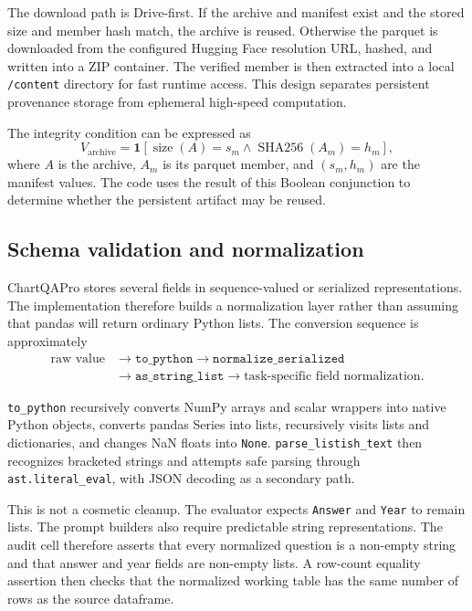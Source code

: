 \documentclass[11pt,a4paper]{article}
\newcommand{\code}[1]{\texttt{#1}}
\begin{document}
The download path is Drive-first. If the archive and manifest exist and the stored size and member hash match, the archive is reused. Otherwise the parquet is downloaded from the configured Hugging Face resolution URL, hashed, and written into a ZIP container. The verified member is then extracted into a local \code{/content} directory for fast runtime access. This design separates persistent provenance storage from ephemeral high-speed computation.

The integrity condition can be expressed as
\begin{equation}
V_{\mathrm{archive}}
=
\mathbf{1}\!
\left[
\operatorname{size}(A)=s_m
\land
\operatorname{SHA256}(A_m)=h_m
\right],
\end{equation}
where \(A\) is the archive, \(A_m\) is its parquet member, and \((s_m,h_m)\) are the manifest values. The code uses the result of this Boolean conjunction to determine whether the persistent artifact may be reused.

\subsection{Schema validation and normalization}
ChartQAPro stores several fields in sequence-valued or serialized representations. The implementation therefore builds a normalization layer rather than assuming that pandas will return ordinary Python lists. The conversion sequence is approximately
\[
\begin{aligned}
\text{raw value} &\rightarrow \texttt{to\_python}
\rightarrow \texttt{normalize\_serialized} \\
&\rightarrow \texttt{as\_string\_list}
\rightarrow \text{task-specific field normalization}.
\end{aligned}
\]

\code{to\_python} recursively converts NumPy arrays and scalar wrappers into native Python objects, converts pandas Series into lists, recursively visits lists and dictionaries, and changes NaN floats into \code{None}. \code{parse\_listish\_text} then recognizes bracketed strings and attempts safe parsing through \code{ast.literal\_eval}, with JSON decoding as a secondary path.

This is not a cosmetic cleanup. The evaluator expects \code{Answer} and \code{Year} to remain lists. The prompt builders also require predictable string representations. The audit cell therefore asserts that every normalized question is a non-empty string and that answer and year fields are non-empty lists. A row-count equality assertion then checks that the normalized working table has the same number of rows as the source dataframe.
\end{document}
